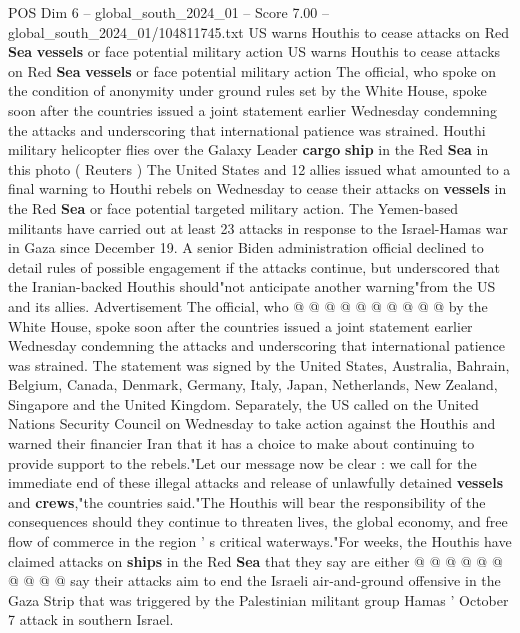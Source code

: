 \begin{textsample}{POS Dim 6 – global\_south\_2024\_01 – Score 7.00 – global\_south\_2024\_01/104811745.txt}  \label{ex:f6_pos_088}
US warns Houthis to cease attacks on Red \textbf{Sea} \textbf{vessels} or face potential military action US warns Houthis to cease attacks on Red \textbf{Sea} \textbf{vessels} or face potential military action The official, who spoke on the condition of anonymity under ground rules set by the White House, spoke soon after the countries issued a joint statement earlier Wednesday condemning the attacks and underscoring that international patience was strained.
Houthi military helicopter flies over the Galaxy Leader \textbf{cargo} \textbf{ship} in the Red \textbf{Sea} in this photo ( Reuters ) The United States and 12 allies issued what amounted to a final warning to Houthi rebels on Wednesday to cease their attacks on \textbf{vessels} in the Red \textbf{Sea} or face potential targeted military action.
The Yemen-based militants have carried out at least 23 attacks in response to the Israel-Hamas war in Gaza since December 19.
A senior Biden administration official declined to detail rules of possible engagement if the attacks continue, but underscored that the Iranian-backed Houthis should"not anticipate another warning"from the US and its allies.
Advertisement The official, who @ @ @ @ @ @ @ @ @ @ by the White House, spoke soon after the countries issued a joint statement earlier Wednesday condemning the attacks and underscoring that international patience was strained.
The statement was signed by the United States, Australia, Bahrain, Belgium, Canada, Denmark, Germany, Italy, Japan, Netherlands, New Zealand, Singapore and the United Kingdom.
Separately, the US called on the United Nations Security Council on Wednesday to take action against the Houthis and warned their financier Iran that it has a choice to make about continuing to provide support to the rebels."Let our message now be clear : we call for the immediate end of these illegal attacks and release of unlawfully detained \textbf{vessels} and \textbf{crews},"the countries said."The Houthis will bear the responsibility of the consequences should they continue to threaten lives, the global economy, and free flow of commerce in the region ' s critical waterways."For weeks, the Houthis have claimed attacks on \textbf{ships} in the Red \textbf{Sea} that they say are either @ @ @ @ @ @ @ @ @ @ say their attacks aim to end the Israeli air-and-ground offensive in the Gaza Strip that was triggered by the Palestinian militant group Hamas ' October 7 attack in southern Israel.

\end{textsample}
